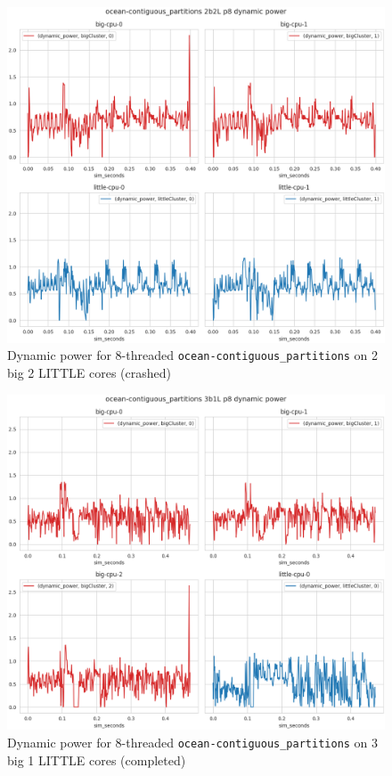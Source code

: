 \begin{figure}[H]
    \centering
    \includegraphics[height=0.6\textheight]{roi-plots/ocean-contiguous/2b2L/p8-fail-dyn-pow.png}
    \caption{Dynamic power for 8-threaded \texttt{ocean-contiguous\_partitions}
             on 2 big 2 LITTLE cores (crashed)}
\end{figure}

\begin{figure}[H]
    \centering
    \includegraphics[height=0.6\textheight]{roi-plots/ocean-contiguous/3b1L/p8-success-dyn-pow.png}
    \caption{Dynamic power for 8-threaded \texttt{ocean-contiguous\_partitions}
             on 3 big 1 LITTLE cores (completed)}
\end{figure}


